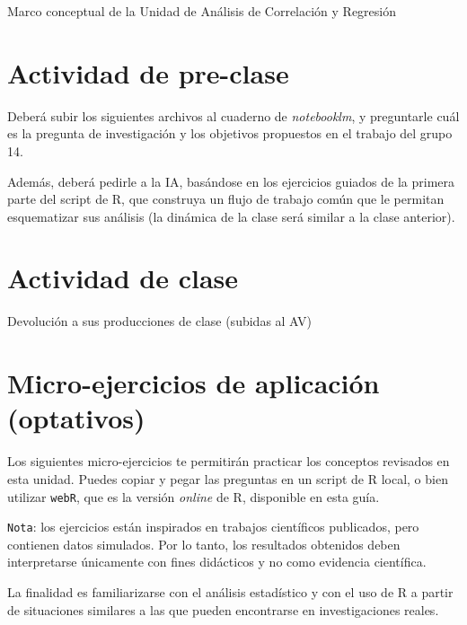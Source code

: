 \documentclass[
  spanish,
  letterpaper,
  DIV=11,
  numbers=noendperiod]{scrreprt}
\begin{document}
Marco conceptual de la Unidad de Análisis de Correlación y Regresión

\section{\texorpdfstring{\textbf{Actividad de
pre-clase}}{Actividad de pre-clase}}\label{actividad-de-pre-clase-5}

Deberá subir los siguientes archivos al cuaderno de \emph{notebooklm}, y
preguntarle cuál es la pregunta de investigación y los objetivos
propuestos en el trabajo del grupo 14.

Además, deberá pedirle a la IA, basándose en los ejercicios guiados de
la primera parte del script de R, que construya un flujo de trabajo
común que le permitan esquematizar sus análisis (la dinámica de la clase
será similar a la clase anterior).

\section{\texorpdfstring{\textbf{Actividad de
clase}}{Actividad de clase}}\label{actividad-de-clase-3}

Devolución a sus producciones de clase (subidas al AV)

\section{Micro-ejercicios de aplicación
(optativos)}\label{micro-ejercicios-de-aplicaciuxf3n-optativos-8}

Los siguientes micro-ejercicios te permitirán practicar los conceptos
revisados en esta unidad. Puedes copiar y pegar las preguntas en un
script de R local, o bien utilizar \texttt{webR}, que es la versión
\emph{online} de R, disponible en esta guía.

\texttt{Nota}: los ejercicios están inspirados en trabajos científicos
publicados, pero contienen datos simulados. Por lo tanto, los resultados
obtenidos deben interpretarse únicamente con fines didácticos y no como
evidencia científica.

La finalidad es familiarizarse con el análisis estadístico y con el uso
de R a partir de situaciones similares a las que pueden encontrarse en
investigaciones reales.
\end{document}
